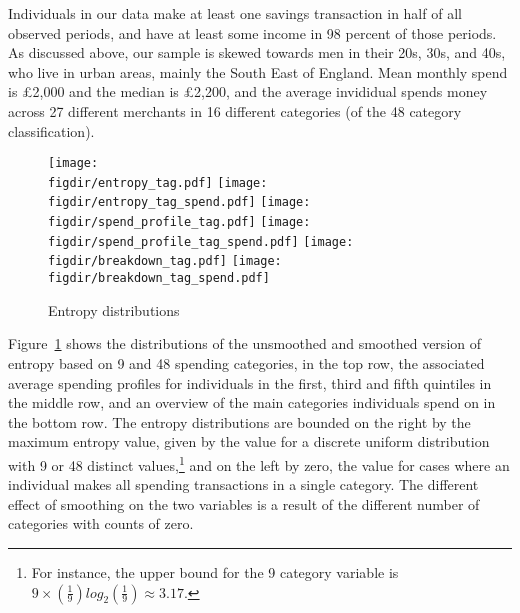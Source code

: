 Individuals in our data make at least one savings transaction in half of all
observed periods, and have at least some income in 98 percent of those periods.
As discussed above, our sample is skewed towards men in their 20s, 30s, and
40s, who live in urban areas, mainly the South East of England. Mean monthly
spend is \pounds2,000 and the median is \pounds2,200, and the average
invididual spends money across 27 different merchants in 16 different
categories (of the 48 category classification).

\begin{figure}[ht] \centering \caption{Entropy distributions}
    \label{fig:entropy}
    \texttt{[image: \\figdir/entropy\_tag.pdf]}
    \texttt{[image: \\figdir/entropy\_tag\_spend.pdf]}
    \texttt{[image: \\figdir/spend\_profile\_tag.pdf]}
    \texttt{[image: \\figdir/spend\_profile\_tag\_spend.pdf]}
    \texttt{[image: \\figdir/breakdown\_tag.pdf]}
    \texttt{[image: \\figdir/breakdown\_tag\_spend.pdf]}
\end{figure}

Figure~\ref{fig:entropy} shows the distributions of the unsmoothed and smoothed
version of entropy based on 9 and 48 spending categories, in the top row, the
associated average spending profiles for individuals in the first, third and
fifth quintiles in the middle row, and an overview of the main categories
individuals spend on in the bottom row. The entropy distributions are bounded
on the right by the maximum entropy value, given by the value for a discrete
uniform distribution with 9 or 48 distinct values,\footnote{For instance, the
upper bound for the 9 category variable is $9 \times
\left(\frac{1}{9}\right)log_2\left(\frac{1}{9}\right) \approx 3.17$.} and on
the left by zero, the value for cases where an individual makes all spending
transactions in a single category. The different effect of smoothing on the two
variables is a result of the different number of categories with counts of
zero.

